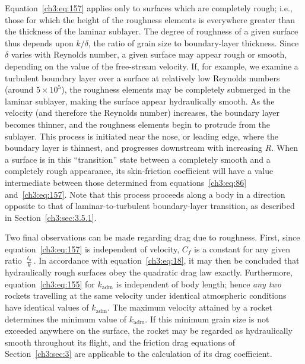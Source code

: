 Equation~\eqref{ch3:eq:157} applies only to surfaces which are completely rough; i.e., those for
which the height of the roughness elements is everywhere greater than the thickness of the laminar
sublayer. The degree of roughness of a given surface thus depends upon $k/\delta$, the ratio of
grain size to boundary-layer thickness. Since $\delta$ varies with Reynolds number, a given surface
may appear rough or smooth, depending on the value of the free-stream velocity. If, for example,
we examine a turbulent boundary layer over a surface at relatively low Reynolds numbers (around
$5 \times 10^{5}$), the roughness elements may be completely submerged in the laminar sublayer,
making the surface appear hydraulically smooth. As the velocity (and therefore the Reynolds number)
increases, the boundary layer becomes thinner, and the roughness elements begin to protrude from
the sublayer. This process is initiated near the nose, or leading edge, where the boundary layer is
thinnest, and progresses downstream with increasing $R$. When a surface is in this ``transition''
state between a completely smooth and a completely rough appearance, its skin-friction coefficient
will have a value intermediate between those determined from equations~\eqref{ch3:eq:86}
and~\eqref{ch3:eq:157}. Note that this process proceeds along a body in a direction opposite to
that of laminar-to-turbulent boundary-layer transition, as described in
Section~\ref{ch3:sec:3.5.1}.

Two final observations can be made regarding drag due to roughness. First, since
equation~\eqref{ch3:eq:157} is independent of velocity, $C_f$ is a constant for any given ratio
$\frac{\ell_b}{k}$. In accordance with equation~\eqref{ch3:eq:18}, it may then be concluded that
hydraulically rough surfaces obey the quadratic drag law exactly. Furthermore,
equation~\eqref{ch3:eq:155} for $k_{\mathrm{adm}}$ is independent of body length; hence \emph{any
two} rockets travelling at the same velocity under identical atmospheric conditions have identical
values of $k_{\mathrm{adm}}$. The maximum velocity attained by a rocket determines the minimum
value of $k_{\mathrm{adm}}$. If this minimum grain size is not exceeded anywhere on the surface, the
rocket may be regarded as hydraulically smooth throughout its flight, and the friction drag
equations of Section~\ref{ch3:sec:3} are applicable to the calculation of its drag coefficient.
